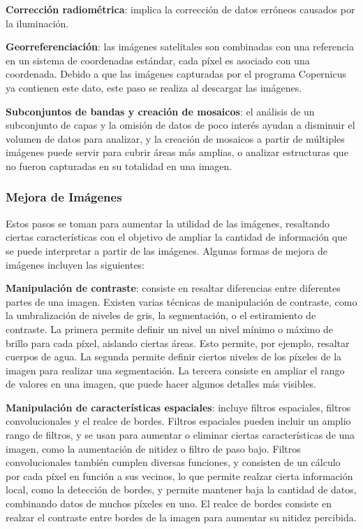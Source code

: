 
{\bf Corrección radiométrica}: implica la corrección de datos erróneos causados por la iluminación.


{\bf Georreferenciación}: las imágenes satelitales son combinadas con una referencia en un sistema de coordenadas
estándar, cada píxel es asociado con una coordenada. Debido a que las imágenes capturadas por el programa Copernicus ya
contienen este dato, este paso se realiza al descargar las imágenes.

{\bf Subconjuntos de bandas y creación de mosaicos}: el análisis de un subconjunto de capas y la omisión de datos de
poco interés ayudan a disminuir el volumen de datos para analizar, y la creación de mosaicos a partir de múltiples
imágenes puede servir para cubrir áreas más amplias, o analizar estructuras que no fueron capturadas en su totalidad en
una imagen.

\subsubsection{Mejora de Imágenes}

Estos pasos se toman para aumentar la utilidad de las imágenes, resaltando ciertas características con el objetivo de
ampliar la cantidad de información que se puede interpretar a partir de las imágenes. Algunas formas de mejora de
imágenes incluyen las siguientes:

{\bf Manipulación de contraste}: consiste en resaltar diferencias entre diferentes partes de una imagen. Existen varias
técnicas de manipulación de contraste, como la umbralización de niveles de gris, la segmentación, o el estiramiento de
contraste. La primera permite definir un nivel un nivel mínimo o máximo de brillo para cada píxel, aislando ciertas
áreas. Esto permite, por ejemplo, resaltar cuerpos de agua. La segunda permite definir ciertos niveles de los píxeles
de la imagen para realizar una segmentación. La tercera consiste en ampliar el rango de valores en una imagen, que
puede hacer algunos detalles más visibles.

{\bf Manipulación de características espaciales}: incluye filtros espaciales, filtros convolucionales y el realce de
bordes. Filtros espaciales pueden incluir un amplio rango de filtros, y se usan para aumentar o eliminar ciertas
características de una imagen, como la aumentación de nitidez o filtro de paso bajo. Filtros convolucionales también
cumplen diversas funciones, y consisten de un cálculo por cada píxel en función a sus vecinos, lo que permite realzar
cierta información local, como la detección de bordes, y permite mantener baja la cantidad de datos, combinando datos
de muchos píxeles en uno. El realce de bordes consiste en realzar el contraste entre bordes de la imagen para aumentar
su nitidez percibida.

